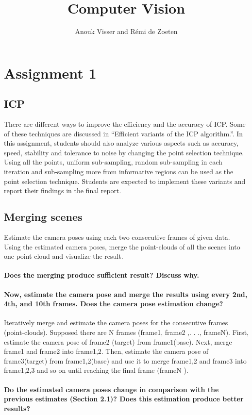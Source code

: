 \documentclass[12pt]{amsart}
\title{Computer Vision}
\author{Anouk Visser and R\'emi de Zoeten}
\date{} %
\begin{document}
\maketitle

\section{Assignment 1}
\subsection{ICP}
There are different ways to improve the efficiency and the accuracy of ICP. Some of these techniques are discussed in ``Efficient variants of the ICP algorithm.''. In this assignment, students should also analyze various aspects such as accuracy, speed, stability and tolerance to noise by changing the point selection technique. Using all the points, uniform sub-sampling, random sub-sampling in each iteration and sub-sampling more from informative regions can be used as the point selection technique. Students are expected to implement these variants and report their findings in the final report.
\subsection{Merging scenes}
Estimate the camera poses using each two consecutive frames of given data. Using the estimated camera poses, merge the point-clouds of all the scenes into one point-cloud and visualize the result. 
\\\\
\textbf{Does the merging produce sufficient result? Discuss why.}
\\\\
\textbf{Now, estimate the camera pose and merge the results using every 2nd, 4th, and 10th frames. Does the camera pose estimation change?}
\\\\
Iteratively merge and estimate the camera poses for the consecutive frames (point-clouds). Supposed there are N frames (frame1, frame2 ,. . ., frameN). First, estimate the camera pose of frame2 (target) from frame1(base). Next, merge frame1 and frame2 into frame1,2. Then, estimate the camera pose of frame3(target) from frame1,2(base) and use it to merge frame1,2 and frame3 into frame1,2,3 and so on until reaching the final frame (frameN ).\\\\ \textbf{Do the estimated camera poses change in comparison with the previous estimates (Section 2.1)? Does this estimation produce better results?}
\end{document}
